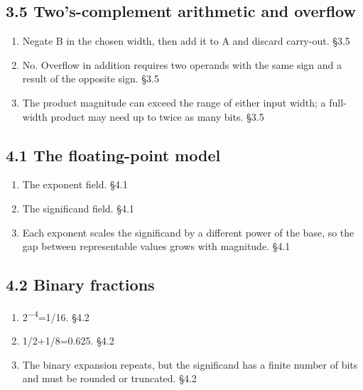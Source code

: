 \documentclass[11pt]{article}
\begin{document}
\begin{keepsection}\subsection{3.5 Two’s-complement arithmetic and overflow}

\begin{enumerate}
\item Negate B in the chosen width, then add it to A and discard carry-out. \hfill{\small\color{FAUblue}§3.5}
\item No. Overflow in addition requires two operands with the same sign and a result of the opposite sign. \hfill{\small\color{FAUblue}§3.5}
\item The product magnitude can exceed the range of either input width; a full-width product may need up to twice as many bits. \hfill{\small\color{FAUblue}§3.5}
\end{enumerate}

\end{keepsection}
\begin{keepsection}\subsection{4.1 The floating-point model}

\begin{enumerate}
\item The exponent field. \hfill{\small\color{FAUblue}§4.1}
\item The significand field. \hfill{\small\color{FAUblue}§4.1}
\item Each exponent scales the significand by a different power of the base, so the gap between representable values grows with magnitude. \hfill{\small\color{FAUblue}§4.1}
\end{enumerate}

\end{keepsection}
\begin{keepsection}\subsection{4.2 Binary fractions}

\begin{enumerate}
\item 2\textsuperscript{\ensuremath{-}4}=1/16. \hfill{\small\color{FAUblue}§4.2}
\item 1/2+1/8=0.625. \hfill{\small\color{FAUblue}§4.2}
\item The binary expansion repeats, but the significand has a finite number of bits and must be rounded or truncated. \hfill{\small\color{FAUblue}§4.2}
\end{enumerate}

\end{keepsection}
\end{document}
